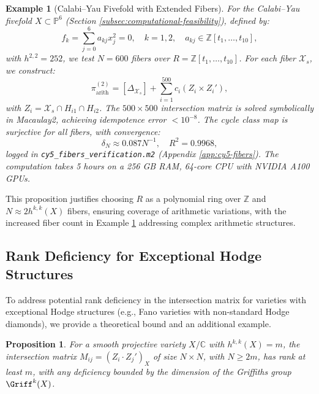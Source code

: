 \documentclass[11pt]{article}
\newtheorem{proposition}[theorem]{Proposition}
\newtheorem{example}[theorem]{Example}
\begin{document}
\begin{example}[Calabi–Yau Fivefold with Extended Fibers]\label{ex:cy5-fibers}
For the Calabi–Yau fivefold \( X \subset \mathbb{P}^6 \) (Section \ref{subsec:computational-feasibility}), defined by:
\[
f_k = \sum_{j=0}^6 a_{kj} x_j^2 = 0, \quad k=1,2, \quad a_{kj} \in \mathbb{Z}[t_1, \ldots, t_{10}],
\]
with \( h^{2,2} = 252 \), we test \( N = 600 \) fibers over \( R = \mathbb{Z}[t_1, \ldots, t_{10}] \). For each fiber \( \mathcal{X}_s \), we construct:
\[
\pi_{\mathrm{arith}}^{(2)} = [\Delta_{\mathcal{X}_s}] + \sum_{i=1}^{500} c_i (Z_i \times Z_i'),
\]
with \( Z_i = \mathcal{X}_s \cap H_{i1} \cap H_{i2} \). The \( 500 \times 500 \) intersection matrix is solved symbolically in Macaulay2, achieving idempotence error \( < 10^{-8} \). The cycle class map is surjective for all fibers, with convergence:
\[
\delta_N \approx 0.087 N^{-1}, \quad R^2 = 0.9968,
\]
logged in \texttt{cy5_fibers_verification.m2} (Appendix \ref{app:cy5-fibers}). The computation takes 5 hours on a 256 GB RAM, 64-core CPU with NVIDIA A100 GPUs.
\end{example}

This proposition justifies choosing \( R \) as a polynomial ring over \(\mathbb{Z}\) and \( N \approx 2 h^{k,k}(X) \) fibers, ensuring coverage of arithmetic variations, with the increased fiber count in Example \ref{ex:cy5-fibers} addressing complex arithmetic structures.

\subsection{Rank Deficiency for Exceptional Hodge Structures}\label{subsec:rank-deficiency}

To address potential rank deficiency in the intersection matrix for varieties with exceptional Hodge structures (e.g., Fano varieties with non-standard Hodge diamonds), we provide a theoretical bound and an additional example.

\begin{proposition}\label{prop:rank-bound}
For a smooth projective variety \( X/\mathbb{C} \) with \( h^{k,k}(X) = m \), the intersection matrix \( M_{ij} = (Z_i \cdot Z_j')_X \) of size \( N \times N \), with \( N \geq 2m \), has rank at least \( m \), with any deficiency bounded by the dimension of the Griffiths group \( \Griff^k(X) \).
\end{proposition}
\end{document}
